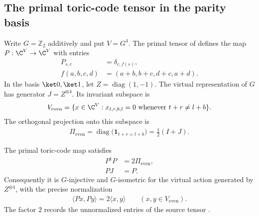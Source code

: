 \subsection{The primal toric-code tensor in the parity basis}

\begin{definition}%
    \label{def:peps_toric_code_primal_virtual_symmetry}
    \leanok
    Write $G=\mathbb Z_2$ additively and put $V=G^4$.
    The primal tensor of
    \cite[Appendix~A, ``The Toric Code and quantum double models'']{Cirac2021Matrix}
    defines the map $P:\C^V\to\C^V$ with entries
    \begin{align}
        P_{s,c}    & =\delta_{c,f(s)},   \\
        f(a,b,c,d) & =(a+b,b+c,d+c,a+d).
    \end{align}
    In the basis $\ket0,\ket1$, let $Z=\operatorname{diag}(1,-1)$.
    The virtual representation of $G$ has generator
    $J=Z^{\otimes4}$. Its invariant subspace is
    \begin{align}
        V_{\mathrm{even}}
        =\{x\in\C^V:x_{t,r,b,l}=0\text{ whenever }t+r\ne l+b\}.
    \end{align}
    The orthogonal projection onto this subspace is
    \begin{align}
        \Pi_{\mathrm{even}}
        =\operatorname{diag}\bigl(\mathbf1_{t+r=l+b}\bigr)
        =\tfrac12(I+J).
    \end{align}
\end{definition}

\begin{lemma}%
    \label{thm:peps_toric_code_primal_g_isometric}
    \leanok
    The primal toric-code map satisfies
    \begin{align}
        P^\dagger P & =2\Pi_{\mathrm{even}}, \\
        PJ          & =P.
    \end{align}
    Consequently it is $G$-injective and $G$-isometric for the virtual
    action generated by $Z^{\otimes4}$, with the precise normalization
    \begin{align}
        \langle Px,Py\rangle=2\langle x,y\rangle
        \qquad(x,y\in V_{\mathrm{even}}).
    \end{align}
    The factor $2$ records the unnormalized entries of the source tensor
    \cite{gap:rmp_peps_quantum_double_g_isometry}.
\end{lemma}

